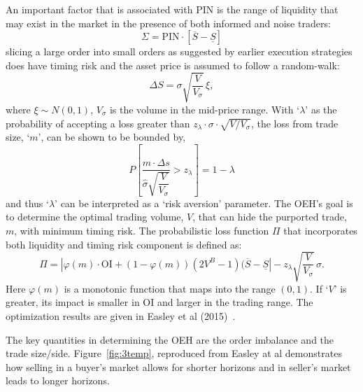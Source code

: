 An important factor that is associated with PIN is the range of liquidity that may exist in the market in the presence of both informed and noise traders:
	\begin{equation}\label{eqn:newsigma}
	\Sigma = \text{PIN} \cdot [\overline{S} - \underline{S}]
	\end{equation}
slicing a large order into small orders as suggested by earlier execution strategies does have timing risk and the asset price is assumed to follow a random-walk:
	\begin{equation}\label{eqn:randomwalk}
	\Delta S=\sigma \sqrt{\dfrac{V}{V_\sigma}} \, \xi,
	\end{equation}
where $\xi \sim N(0,1)$, $V_\sigma$ is the volume in the mid-price range. With `$\lambda$' as the probability of accepting a loss greater than $z_\lambda \cdot \sigma \cdot \sqrt{V/V_\sigma}$, the loss from trade size, `$m$', can be shown to be bounded by,
	\begin{equation}\label{eqn:bigbracp}
	P \left[ \dfrac{m \cdot \Delta s}{\hat{\sigma} \sqrt{\dfrac{V}{V_\sigma}}} > z_\lambda \right] = 1-\lambda
	\end{equation}
and thus `$\lambda$' can be interpreted as a `risk aversion' parameter. The OEH's goal is to determine the optimal trading volume, $V$, that can hide the purported trade, $m$, with minimum timing risk. The probabilistic loss function $\Pi$ that incorporates both liquidity and timing risk component is defined as:
	\begin{equation}\label{eqn:pi}
	\Pi = \left| \varphi(m) \cdot \text{OI} + (1-\varphi(m)) (2V^B-1)(\overline{S}-\underline{S}\right| - z_\lambda \sqrt{\dfrac{V}{V_\sigma}} \, \sigma.
	\end{equation}
Here $\varphi(m)$ is a monotonic function that maps into the range $(0,1)$. If `$V$' is greater, its impact is smaller in OI and larger in the trading range. The optimization results are given in Easley et al (2015)~\cite{prado2}.


The key quantities in determining the OEH are the order imbalance and the trade size/side. Figure~\ref{fig:3temp}, reproduced from Easley at al demonstrates how selling in a buyer's market allows for shorter horizons and in seller's market leads to longer horizons.  


